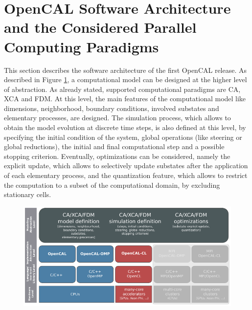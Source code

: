   \section{OpenCAL Software Architecture and the Considered Parallel Computing Paradigms}
  This section describes the software architecture of the first
  OpenCAL release. As described in Figure \ref{fig:architecture}, a
  computational model can be designed at the higher level of
  abstraction. As already stated, supported computational paradigms
  are CA, XCA and FDM. At this level, the main features of the
  computational model like dimensions, neighborhood, boundary
  conditions, involved substates and elementary processes, are
  designed. The simulation process, which allows to obtain the model
  evolution at discrete time steps, is also defined at this level, by
  specifying the initial condition of the system, global operations
  (like steering or global reductions), the initial and final
  computational step and a possible stopping criterion. Eventually,
  optimizations can be considered, namely the explicit update, which
  allows to selectively update substates after the application of each
  elementary process, and the quantization feature, which allows to
  restrict the computation to a subset of the computational domain, by
  excluding stationary cells.
  
  \begin{figure}[H]
  \begin{center}
    \includegraphics{./artworks/Figure05.pdf}
    \caption{}
    \label{fig:architecture}
  \end{center}
\end{figure}
  
